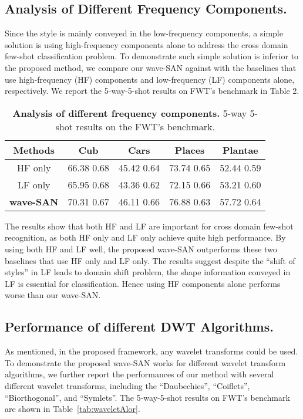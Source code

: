 \documentclass{article}
\newcommand{\mypm}{\scriptsize}
\begin{document}
\subsection{Analysis of Different Frequency Components.} 
Since the style is mainly conveyed in the low-frequency components, a simple solution is using high-frequency components alone to address the cross domain few-shot classification problem. To demonstrate such simple solution is inferior to the proposed method, we compare our wave-SAN against with the baselines that use high-frequency (HF) components and low-frequency (LF) components alone, respectively. We report the 5-way-5-shot results on FWT's benchmark in Table 2. 


\begin{table}[h] \small
\begin{center}
\begin{tabular} { c c c c c}
	\hline
	\textbf{Methods} & \textbf{Cub} & \textbf{Cars} & \textbf{Places} & \textbf{Plantae} \\
	\hline
	HF only    & 66.38 \mypm 0.68 & 45.42 \mypm 0.64
& 73.74 \mypm 0.65 & 52.44 \mypm 0.59 \\
	\hline
	LF only & 65.95 \mypm 0.68 & 43.36 \mypm 0.62 &  72.15 \mypm 0.66 & 53.21 \mypm 0.60 \\
	\hline
	\textbf{wave-SAN}  & 70.31 \mypm 0.67 & 46.11 \mypm 0.66 & 76.88 \mypm 0.63 & 57.72 \mypm 0.64 \\
	\hline
	\end{tabular}
	\end{center}
\caption{\textbf{Analysis of different frequency components.} 5-way 5-shot results on the FWT's benchmark.}
\label{tab:component}
\end{table}

The results show that both HF and LF are important for cross domain few-shot recognition, as both HF only and LF only achieve quite high performance. By using both HF and LF well, the proposed wave-SAN outperforms these two baselines that use HF only and LF only. The results suggest despite the ``shift of styles'' in LF leads to domain shift problem, the shape information conveyed in LF is essential for classification. Hence using HF components alone performs worse than our wave-SAN. 





\subsection{Performance of different DWT Algorithms.}
As mentioned, in the proposed framework, any wavelet transforms could be used. To demonstrate the proposed wave-SAN works for different wavelet transform algorithms, we further report the performances of our method with several different wavelet transforms, including the ``Daubechies'', ``Coiflets'', ``Biorthogonal'', and ``Symlets''. The 5-way-5-shot results on FWT's benchmark are shown in Table~\ref{tab:waveletAlor}.
\end{document}
